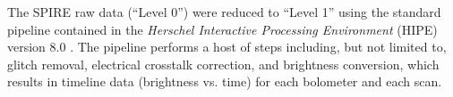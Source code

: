 The SPIRE raw data (``Level 0'') were reduced to ``Level 1'' using the standard pipeline contained in the \textit{Herschel Interactive Processing Environment} (HIPE) version 8.0 \citep{Ott:2010rm}. The pipeline performs a host of steps including, but not limited to, glitch removal, electrical crosstalk correction, and brightness conversion, which results in timeline data (brightness vs. time) for each bolometer and each scan. 